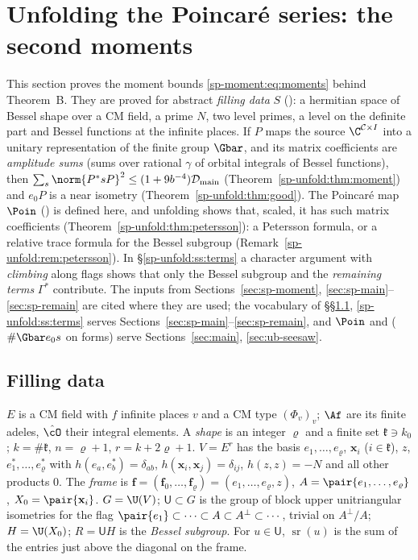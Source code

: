\section{Unfolding the Poincaré series: the second moments}\label{sec:sp-unfold}

This section proves the moment bounds \eqref{sp-moment:eq:moments} behind Theorem~B. They are proved
for abstract \emph{filling data} $S$ (): a hermitian space of Bessel shape over a
CM field, a prime $N$, two level primes, a level on the definite part and Bessel functions at the
infinite places. If $P$ maps the source $\C^{\mathcal C\times I}$ into a unitary representation of
the finite group $\Gbar$, and its matrix coefficients are \emph{amplitude sums}
(sums over rational $\gamma$ of orbital integrals of Bessel functions), then
$\sum_s\norm{P^*sP}^2\le(1+9b^{-4})\mathcal D_{\mathrm{main}}$ (Theorem~\ref{sp-unfold:thm:moment})
and $e_0P$ is a near isometry (Theorem~\ref{sp-unfold:thm:good}). The Poincaré map $\Poin$
() is defined here, and unfolding shows that, scaled, it has such matrix
coefficients (Theorem~\ref{sp-unfold:thm:petersson}): a Petersson formula, or a relative trace
formula for the Bessel subgroup (Remark~\ref{sp-unfold:rem:petersson}). In \S\ref{sp-unfold:ss:terms}
a character argument with \emph{climbing} along flags shows that only the Bessel subgroup and the
\emph{remaining terms} $\Gamma^*$ contribute. The inputs from Sections~\ref{sec:sp-moment},
\ref{sec:sp-main}--\ref{sec:sp-remain} are cited where they are used; the vocabulary of
\S\S\ref{sp-unfold:ss:data}, \ref{sp-unfold:ss:terms} serves Sections~\ref{sec:sp-main}--\ref{sec:sp-remain},
and $\Poin$ and  ($\#\Gbar e_0s$ on forms) serve
Sections~\ref{sec:main}, \ref{sec:ub-seesaw}.

\subsection{Filling data}\label{sp-unfold:ss:data}

$E$ is a CM field with $f$ infinite places $v$ and a CM type $(\Phi_v)_v$; $\Af$ are its finite
adeles, $\hat\cO$ their integral elements. A \emph{shape} is an integer $\varrho$ and a finite set
$\mathfrak k\ni k_0$; $k=\#\mathfrak k$, $n=\varrho+1$, $r=k+2\varrho+1$. $V=E^r$ has the basis
$e_1,\dots,e_\varrho$, $\mathbf x_i$ ($i\in\mathfrak k$), $z$, $e_1^*,\dots,e_\varrho^*$ with
$h(e_a,e_b^*)=\delta_{ab}$, $h(\mathbf x_i,\mathbf x_j)=\delta_{ij}$, $h(z,z)=-N$ and all other products $0$. The
\emph{frame} is $\mathbf f=(\mathbf f_0,\dots,\mathbf f_\varrho)=(e_1,\dots,e_\varrho,z)$,
$A=\pair{e_1,\dots,e_\varrho}$, $X_0=\pair{\mathbf x_i}$. $G=\U(V)$; $\mathsf U\subset G$ is the group of
block upper unitriangular isometries for the flag $\pair{e_1}\subset\dots\subset A\subset A^\perp
\subset\cdots$, trivial on $A^\perp/A$; $H=\U(X_0)$; $R=\mathsf UH$ is the \emph{Bessel subgroup}.
For $u\in\mathsf U$, $\operatorname{sr}(u)$ is the sum of the entries just above the diagonal on the frame.

